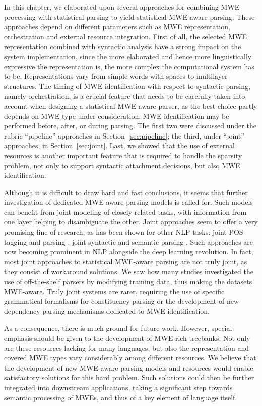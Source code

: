 \documentclass[output=paper]{LSP/langsci}
\begin{document}
In this chapter, we 
elaborated upon
several approaches for combining MWE processing with statistical parsing to yield statistical MWE-aware parsing. These approaches depend on different parameters such as MWE representation, orchestration and external resource integration. First of all, the selected MWE representation combined with syntactic analysis have a strong impact on the system implementation, since 
the more elaborated and hence more linguistically expressive the representation is, the more complex the computational system has to be.
Representations vary from simple words with spaces to multilayer structures. The timing of MWE identification with respect to syntactic parsing, namely orchestration, is a crucial feature that needs to be carefully taken into account when designing a statistical MWE-aware parser, as the best choice partly depends on MWE type under consideration. MWE identification may be performed before, after, or during parsing. The first two were discussed under the rubric ``pipeline'' approaches in Section~\ref{sec:pipeline}; the third, under ``joint'' approaches, in Section~\ref{sec:joint}. Last, we showed that the use of external resources is another important feature that is required to handle the sparsity problem, not only to support syntactic attachment decisions, but also MWE identification. 

Although it is difficult to draw hard and fast conclusions, it seems that further investigation of dedicated MWE-aware parsing models is 
called for.
Such models can benefit from joint modeling of closely related tasks, with information from one layer helping to disambiguate the other. 
Joint approaches seem to offer a very promising line of research, as has been shown for other NLP tasks: \eg{} joint POS tagging and parsing \citep{bohnet:2013}, joint syntactic and semantic parsing \citep{henderson:2013}. Such approaches are now becoming prominent in NLP alongside the deep learning revolution. In fact, most joint approaches to statistical MWE-aware parsing are not truly joint, as they consist of workaround solutions. We saw how many studies investigated the use of off-the-shelf parsers by modifying training data, thus making the datasets MWE-aware. Truly joint systems are rarer, requiring the use of specific grammatical formalisms for constituency parsing or the development of new dependency parsing mechanisms dedicated to MWE identification. 

As a consequence, there is much ground for future work.
However, special emphasis should be given to the development of MWE-rich treebanks.
Not only are these resources lacking for many languages, but also the representation and covered MWE types vary considerably among different resources.
We believe that the development of new MWE-aware parsing models and resources would enable satisfactory solutions for this hard problem.
Such solutions could then be further integrated into downstream applications, taking a significant step towards semantic processing of MWEs, and thus of a key element of language itself.
\end{document}
